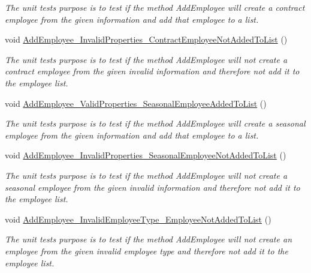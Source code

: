 \begin{DoxyCompactItemize}
\begin{DoxyCompactList}\small\item\em The unit test\textquotesingle{}s purpose is to test if the method Add\+Employee will create a contract employee from the given information and add that employee to a list. \end{DoxyCompactList}\item 
void \hyperlink{class_the_company_1_1_tests_1_1_add_employee_tests_a5a79ce8cc50df9bc509f3b6a54065867}{Add\+Employee\+\_\+\+Invalid\+Properties\+\_\+\+Contract\+Employee\+Not\+Added\+To\+List} ()
\begin{DoxyCompactList}\small\item\em The unit test\textquotesingle{}s purpose is to test if the method Add\+Employee will not create a contract employee from the given invalid information and therefore not add it to the employee list. \end{DoxyCompactList}\item 
void \hyperlink{class_the_company_1_1_tests_1_1_add_employee_tests_a3c3f8aff01f9c84800a8934b593c6cba}{Add\+Employee\+\_\+\+Valid\+Properties\+\_\+\+Seasonal\+Employee\+Added\+To\+List} ()
\begin{DoxyCompactList}\small\item\em The unit test\textquotesingle{}s purpose is to test if the method Add\+Employee will create a seasonal employee from the given information and add that employee to a list. \end{DoxyCompactList}\item 
void \hyperlink{class_the_company_1_1_tests_1_1_add_employee_tests_ad53969bc747e488054e9c2d3dffd82d4}{Add\+Employee\+\_\+\+Invalid\+Properties\+\_\+\+Seasonal\+Employee\+Not\+Added\+To\+List} ()
\begin{DoxyCompactList}\small\item\em The unit test\textquotesingle{}s purpose is to test if the method Add\+Employee will not create a seasonal employee from the given invalid information and therefore not add it to the employee list. \end{DoxyCompactList}\item 
void \hyperlink{class_the_company_1_1_tests_1_1_add_employee_tests_a5df4ad5271ea9e8b1d34111800128944}{Add\+Employee\+\_\+\+Invalid\+Employee\+Type\+\_\+\+Employee\+Not\+Added\+To\+List} ()
\begin{DoxyCompactList}\small\item\em The unit test\textquotesingle{}s purpose is to test if the method Add\+Employee will not create an employee from the given invalid employee type and therefore not add it to the employee list. \end{DoxyCompactList}\end{DoxyCompactItemize}
